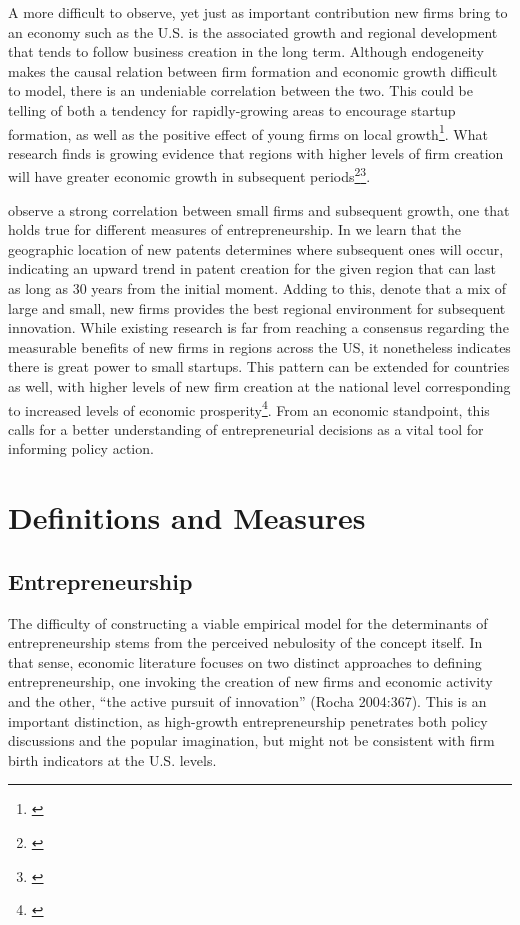 A more difficult to observe, yet just as important contribution new firms bring to an economy such as the U.S. is the associated growth and regional development that tends to follow business creation in the long term. Although endogeneity makes the causal relation between firm formation and economic growth difficult to model, there is an undeniable correlation between the two. This could be telling of both a tendency for rapidly-growing areas to encourage startup formation, as well as the positive effect of young firms on local growth\footnote{\cite{ChatterjiGlaeserKerr2014}}. What research finds is growing evidence that regions with higher levels of firm creation will have greater economic growth in subsequent periods\footnote{\cite{GartnerShaverCarterReynolds2004}}\hspace{.2em}\footnote{\cite{AcsArmington2006}}. 

\cite{GlaeserKallalScheinkmanShleifer1992} observe a strong correlation between small firms and subsequent growth, one that holds true for different measures of entrepreneurship. In \cite{Kerr2010} we learn that the geographic location of new patents determines where subsequent ones will occur, indicating an upward trend in patent creation for the given region that can last as long as 30 years from the initial moment. Adding to this, \cite{AgrawalCockburnGalassoOettl2012} denote that a mix of large and small, new firms provides the best regional environment for subsequent innovation.  While existing research is far from reaching a consensus regarding the measurable benefits of new firms in regions across the US, it nonetheless indicates there is great power to small startups. This pattern can be extended for countries as well, with higher levels of new firm creation at the national level corresponding to increased levels of economic prosperity\footnote{\cite{GartnerShaverCarterReynolds2004}}. From an economic standpoint, this calls for a better understanding of entrepreneurial decisions as a vital tool for informing policy action. 

\section{Definitions and Measures}

\subsection{Entrepreneurship}

The difficulty of constructing a viable empirical model for the determinants of entrepreneurship stems from the perceived nebulosity of the concept itself. In that sense, economic literature focuses on two distinct approaches to defining entrepreneurship, one invoking the creation of new firms and economic activity and the other, “the active pursuit of innovation” (Rocha 2004:367). This is an important distinction, as high-growth entrepreneurship penetrates both policy discussions and the popular imagination, but might not be consistent with firm birth indicators at the U.S. levels. 

